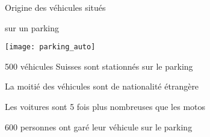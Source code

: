 \begin{QCM}
\begin{GroupeQCM}
 
    \begin{exercice}
      \begin{center} Origine des véhicules situés \end{center}
      \vspace{-0.6cm}
      \begin{center} sur un parking \end{center}
      \begin{center} \texttt{[image: parking\_auto]} \end{center}
      \begin{ChoixQCM}{4}
      \item 500 véhicules Suisses sont stationnés sur le parking
      \item La moitié des véhicules sont de nationalité étrangère
      \item Les voitures sont 5 fois plus nombreuses que les motos
      \item 600 personnes ont garé leur véhicule sur le parking
      \end{ChoixQCM}
\begin{corrige}
   \end{corrige}
    \end{exercice}
    

\end{GroupeQCM}
\end{QCM}

  